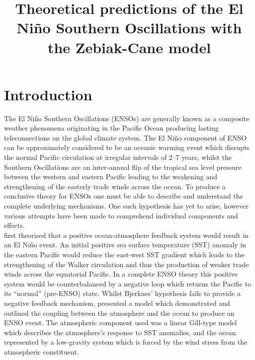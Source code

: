 \documentclass[12pt, onecolumn]{revtex4}    %
\begin{document}
                     

\title{Theoretical predictions of the El Ni\~{n}o Southern Oscillations with the Zebiak-Cane model} 

\maketitle
\thispagestyle{plain} %

\section{Introduction}
The El Ni\~{n}o Southern Oscillations (ENSOs) are generally known as a composite weather phenomena originating in the Pacific Ocean producing lasting teleconnections on the global climate system. The El Ni\~{n}o component of ENSO can be approximately considered to be an oceanic warming event which disrupts the normal Pacific circulation at irregular intervals of 2--7 years, whilst the Southern Oscillations are an inter-annual flip of the tropical sea level pressure between the western and eastern Pacific leading to the weakening and strengthening of the easterly trade winds across the ocean. To produce a conclusive theory for ENSOs one must be able to describe and understand the complete underlying mechanisms. One such hypothesis has yet to arise, however various attempts have been made to comprehend individual components and effects. \\

\cite{doi:10.1175/1520-04931969097} first theorised that a positive ocean-atmosphere feedback system would result in an El Ni\~{n}o event. An initial positive sea surface temperature (SST) anomaly in the eastern Pacific would reduce the east-west SST gradient which leads to the strengthening of the Walker circulation and thus the production of weaker trade winds across the equatorial Pacific. In a complete ENSO theory this positive system would be counterbalanced by a negative loop which returns the Pacific to its ``normal'' (pre-ENSO) state. Whilst Bjerknes' hypothesis fails to provide a negative feedback mechanism, \cite{Zebiak:1987aa} presented a model which demonstrated and outlined the coupling between the atmosphere and the ocean to produce an ENSO event. The atmospheric component used was a linear Gill-type model \citep{Gill:1980aa} which describes the atmosphere's response to SST anomalies, and the ocean represented by a low-gravity system which is forced by the wind stress from the atmospheric constituent. \\
\end{document}
